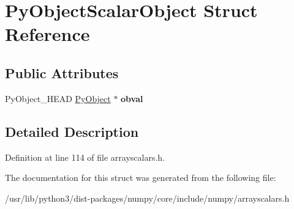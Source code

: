 \hypertarget{structPyObjectScalarObject}{}\section{Py\+Object\+Scalar\+Object Struct Reference}
\label{structPyObjectScalarObject}
\subsection*{Public Attributes}
\begin{DoxyCompactItemize}
\item 
Py\+Object\+\_\+\+H\+E\+AD \hyperlink{struct__object}{Py\+Object} $\ast$ {\bfseries obval}\hypertarget{structPyObjectScalarObject_afbad8d7ad755bd7e049ec5e288a71bd3}{}\label{structPyObjectScalarObject_afbad8d7ad755bd7e049ec5e288a71bd3}

\end{DoxyCompactItemize}


\subsection{Detailed Description}


Definition at line 114 of file arrayscalars.\+h.



The documentation for this struct was generated from the following file\+:\begin{DoxyCompactItemize}
\item 
/usr/lib/python3/dist-\/packages/numpy/core/include/numpy/arrayscalars.\+h\end{DoxyCompactItemize}
